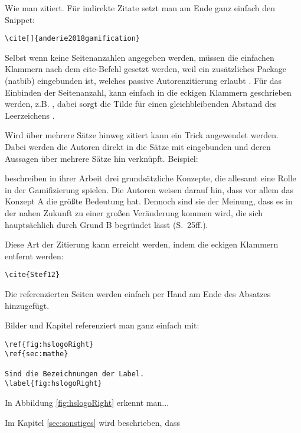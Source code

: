 Wie man zitiert. Für indirekte Zitate setzt man am Ende ganz einfach den Snippet: \begin{verbatim}
\cite[]{anderie2018gamification}
\end{verbatim}
Selbst wenn keine Seitenanzahlen angegeben werden, müssen die einfachen Klammern nach dem cite-Befehl gesetzt werden, weil ein zusätzliches Package (natbib) eingebunden ist, welches passive Autorenzitierung erlaubt \cite[]{anderie2018gamification}. Für das Einbinden der Seitenanzahl, kann einfach in die eckigen Klammern geschrieben werden, z.B. , dabei sorgt die Tilde für einen gleichbleibenden Abstand des Leerzeichens \cite[S.~10f.]{anderie2018gamification}. 
\par 
Wird über mehrere Sätze hinweg zitiert kann ein Trick angewendet werden. Dabei werden die Autoren direkt in die Sätze mit eingebunden und deren Aussagen über mehrere Sätze hin verknüpft. Beispiel:\par 
\cite{Stef12} beschreiben in ihrer Arbeit drei grundsätzliche Konzepte, die allesamt eine Rolle in der Gamifizierung spielen. Die Autoren weisen darauf hin, dass vor allem das Konzept A die größte Bedeutung hat. Dennoch sind sie der Meinung, dass es in der nahen Zukunft zu einer großen Veränderung kommen wird, die sich hauptsächlich durch Grund B begründet lässt (S.~25ff.).
\par 
Diese Art der Zitierung kann erreicht werden, indem die eckigen Klammern entfernt werden:
\begin{verbatim}
\cite{Stef12}
\end{verbatim}
Die referenzierten Seiten werden einfach per Hand am Ende des Absatzes hinzugefügt.
\par
Bilder und Kapitel referenziert man ganz einfach mit:
\begin{verbatim}
\ref{fig:hslogoRight} 
\ref{sec:mathe}

Sind die Bezeichnungen der Label.
\label{fig:hslogoRight}
\end{verbatim}
In Abbildung \ref{fig:hslogoRight} erkennt man...
\par 
Im Kapitel \ref{sec:sonstiges} wird beschrieben, dass